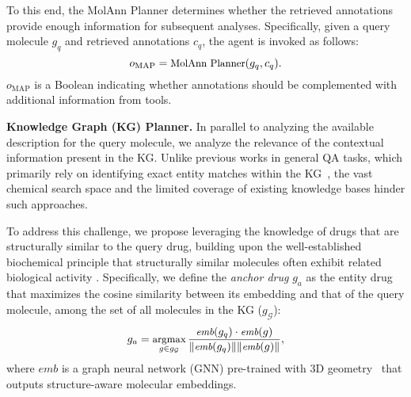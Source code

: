 To this end, the MolAnn Planner determines whether the retrieved annotations provide enough information for subsequent analyses.
Specifically, given a query molecule $g_q$ and retrieved annotations $c_q$, the agent is invoked as follows:
\begin{equation} 
\small
    o_{\text{MAP}} = \text{MolAnn Planner}(g_{q}, c_{q}).
\end{equation}
$o_{\text{MAP}}$ is a Boolean indicating whether annotations should be complemented with additional information from tools.


\noindent \textbf{Knowledge Graph (KG) Planner.}
In parallel to analyzing the available description for the query molecule, we analyze the relevance of the contextual information present in the KG. 
Unlike previous works in general QA tasks, which primarily rely on identifying exact entity matches within the KG~\cite{baek2023knowledge}, the vast chemical search space and the limited coverage of existing knowledge bases hinder such approaches.

To address this challenge, we propose leveraging the knowledge of drugs that are structurally similar to the query drug, building upon the well-established biochemical principle that structurally similar molecules often exhibit related biological activity \cite{martin2002structurally}. Specifically, we define the \emph{anchor drug} $g_{a}$ as the entity drug that maximizes the cosine similarity between its embedding and that of the query molecule, among the set of all molecules in the KG ($g_{\mathcal{G}}$):
\begin{equation}
    \small
    g_{a} = \underset{g \in g_{\mathcal{G}}}{\text{argmax}} \, \frac{\textit{emb}(g_q) \cdot \textit{emb}(g)} {\|\textit{emb}(g_q)\| \|\textit{emb}(g)\|},
\label{eq: GNN}
\end{equation}
where $\textit{emb}$ is a graph neural network (GNN) pre-trained with 3D geometry~\cite{liu2021pre} that outputs structure-aware molecular embeddings.


